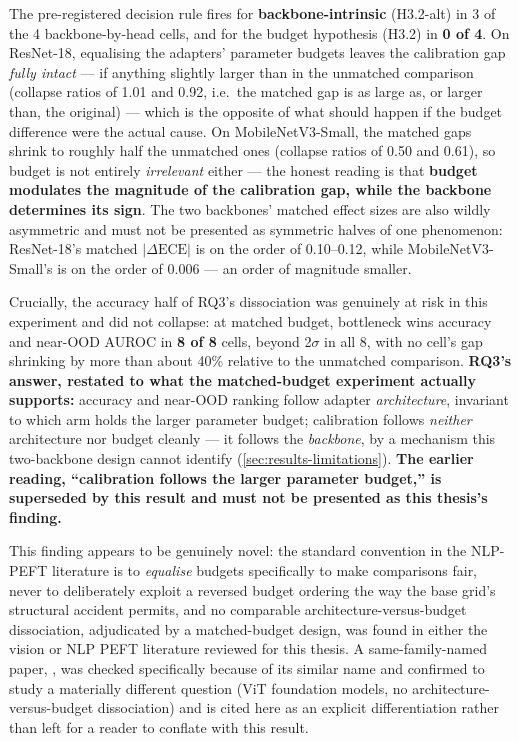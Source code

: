 \documentclass{iutbscthesis}
\begin{document}
The pre-registered decision rule fires for \textbf{backbone-intrinsic} (H3.2-alt) in 3 of the 4 backbone-by-head cells, and for the budget hypothesis (H3.2) in \textbf{0 of 4}. On ResNet-18, equalising the adapters' parameter budgets leaves the calibration gap \emph{fully intact} — if anything slightly larger than in the unmatched comparison (collapse ratios of 1.01 and 0.92, i.e.\ the matched gap is as large as, or larger than, the original) — which is the opposite of what should happen if the budget difference were the actual cause. On MobileNetV3-Small, the matched gaps shrink to roughly half the unmatched ones (collapse ratios of 0.50 and 0.61), so budget is not entirely \emph{irrelevant} either — the honest reading is that \textbf{budget modulates the magnitude of the calibration gap, while the backbone determines its sign}. The two backbones' matched effect sizes are also wildly asymmetric and must not be presented as symmetric halves of one phenomenon: ResNet-18's matched $|\Delta\mathrm{ECE}|$ is on the order of 0.10--0.12, while MobileNetV3-Small's is on the order of 0.006 — an order of magnitude smaller.

Crucially, the accuracy half of RQ3's dissociation was genuinely at risk in this experiment and did not collapse: at matched budget, bottleneck wins accuracy and near-OOD AUROC in \textbf{8 of 8} cells, beyond 2$\sigma$ in all 8, with no cell's gap shrinking by more than about 40\% relative to the unmatched comparison. \textbf{RQ3's answer, restated to what the matched-budget experiment actually supports:} accuracy and near-OOD ranking follow adapter \emph{architecture}, invariant to which arm holds the larger parameter budget; calibration follows \emph{neither} architecture nor budget cleanly — it follows the \emph{backbone}, by a mechanism this two-backbone design cannot identify (\autoref{sec:results-limitations}). \textbf{The earlier reading, ``calibration follows the larger parameter budget,'' is superseded by this result and must not be presented as this thesis's finding.}

This finding appears to be genuinely novel: the standard convention in the NLP-PEFT literature is to \emph{equalise} budgets specifically to make comparisons fair, never to deliberately exploit a reversed budget ordering the way the base grid's structural accident permits, and no comparable architecture-versus-budget dissociation, adjudicated by a matched-budget design, was found in either the vision or NLP PEFT literature reviewed for this thesis. A same-family-named paper, \textcite{pandey2024bayesianpeft}, was checked specifically because of its similar name and confirmed to study a materially different question (ViT foundation models, no architecture-versus-budget dissociation) and is cited here as an explicit differentiation rather than left for a reader to conflate with this result.
\end{document}
